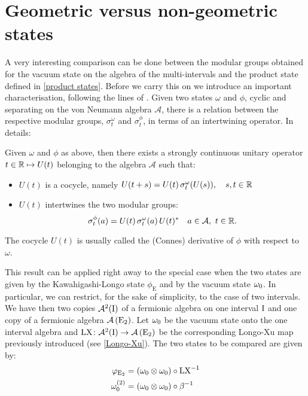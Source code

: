  \section{Geometric versus non-geometric states}
 \label{connes cocycle}
 A very interesting comparison can be done between
 the modular groups obtained for the vacuum state
 on the algebra of the multi-intervals and the
 product state defined in \ref{product states}. 
 Before we carry this on we introduce an 
 important characterisation, following
 the lines of \cite{Summers:2003}. Given two
 states $\omega$ and $\phi$, cyclic and separating
 on the von Neumann algebra 
 $\mathcal{A}$, there is a relation between the
 respective modular groups, $\sigma_t^{\omega}$ and
 $\sigma_t^{\phi}$, in terms of an intertwining 
 operator. In details:
 \begin{theorem}
 Given $\omega$ and $\phi$ as above, then there exists
 a strongly continuous unitary operator $t\in\mathbb{R}\mapsto U(t)$ 
 belonging to the algebra $\mathcal{A}$ such that:
  \begin{itemize}
   \item $U(t)$ is a cocycle, namely $U(t+s) =
         U(t)\,\sigma_t^{\omega}(U(s)),\quad
         s,t\in\mathbb{R}$
   \item $U(t)$ intertwines the two modular groups:
         \[
         \sigma_t^{\phi}(a)=U(t)\,\sigma_t^{\omega}(a)
         \,U(t)^* \quad a\in\mathcal{A},\ t\in\mathbb{R}.
         \]
  \end{itemize}
 The cocycle $U(t)$ is usually called the (Connes)
 derivative of $\phi$ with respect to $\omega$.
 \end{theorem}
 This result can be applied right away to the special
 case when the two states are given by the Kawahigashi-Longo
 state $\phi_{\textrm{E}}$ and by the vacuum state $\omega_0$. 
 In particular, we can restrict, for the sake of
 simplicity, to the case of two intervals. We have then
 two copies $\mathcal{A}^2(\textrm{I})$ of a fermionic algebra
 on one interval $\textrm{I}$ and one copy of a fermionic algebra
 $\mathcal{A}\left(\textrm{E}_2\right)$. Let $\omega_0$ be the vacuum state onto 
 the one interval algebra and $\textrm{LX}\colon\mathcal{A}^2(\textrm{I})
 \to\mathcal{A}\left(\textrm{E}_2\right)$ be the corresponding Longo-Xu map
 previously introduced (see \ref{Longo-Xu}). 
 The two states to be compared are given by:
 \begin{align*}
 \varphi_{\textrm{E}_2}&=\left(\omega_0\otimes\omega_0\right)\circ\textrm{LX}^{-1}\\
 \omega_0^{(2)}&=\left(\omega_0\otimes\omega_0\right)\circ\beta^{-1}
 \end{align*}
